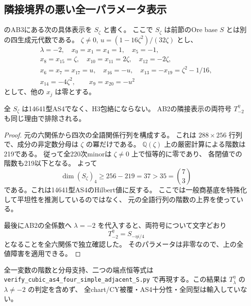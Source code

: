 \subsection{隣接境界の悪い全一パラメータ表示}
\label{subsec:cubic-as4-adjacent-S}
\cite{AS4lowpinned}のAB3にある次の具体表示を $S_\zeta$ と書く。
ここで $S_\zeta$ は前節のOre base $S$ とは別の四生成元代数である。
$\zeta\ne0$, $u=(1-16\zeta^2)/(32\zeta)$ とし、
\[
\begin{gathered}
 \lambda=-2,\quad x_0=x_1=x_4=1,\quad x_5=-1,\\
 x_8=x_{15}=\zeta,\quad x_{10}=x_{11}=2\zeta,\quad x_{12}=-2\zeta,\\
 x_6=x_7=x_{17}=u,\quad x_{16}=-u,\quad
 x_{13}=-x_{19}=\zeta^2-1/16,\\
 x_{14}=-4\zeta^2,\qquad x_9=x_{20}=-u^2
\end{gathered}
\]
として、他の $x_j$ は零とする。

\begin{proposition}\label{prop:cubic-adjacent-S}
全 $S_\zeta$ は14641型AS4でなく、H3包絡にならない。
AB2の隣接表示の両符号 $T^\eta_{-2}$ も同じ理由で排除される。
\end{proposition}
\begin{proof}
元の六関係から四次の全語関係行列を構成する。
これは $288\times256$ 行列で、成分の非定数分母は $\zeta$ の冪だけである。
$\mathbb Q(\zeta)$ 上の厳密計算による階数は219である。
従って全220次minorは $\zeta\ne0$ 上で恒等的に零であり、
各閉値での階数も219以下となる。
よって
\[
 \dim(S_\zeta)_4\ge256-219=37>35=\binom73
\]
である。これは14641型AS4のHilbert値に反する。
ここでは一般商基底を特殊化して平坦性を推測しているのではなく、
元の全語行列の階数の上界を使っている。

最後にAB2の全係数へ $\lambda=-2$ を代入すると、両符号について文字どおり
\[
 T^\eta_{-2}=S_{-\eta i/4}
\]
となることを全六関係で独立確認した。
そのパラメータは非零なので、上の全値障害を適用できる。
\end{proof}

全一変数の階数と分母支持、二つの端点恒等式は
\texttt{verify\_\allowbreak{}cubic\_\allowbreak{}as4\_\allowbreak{}four\_\allowbreak{}simple\_\allowbreak{}adjacent\_\allowbreak{}S.py}
で再現する。この結果は $T^\eta_\lambda$ の $\lambda\ne-2$ の判定を含めず、
全chart/CY被覆・AS4十分性・全同型は輸入していない。

